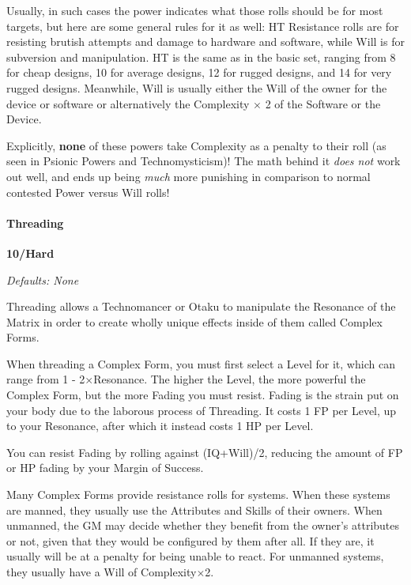 \begin{multicols*}{3}
	Usually, in such cases the power indicates what those rolls should be for most targets, but here are some general rules for it as well: HT Resistance rolls are for resisting brutish attempts and damage to hardware and software, while Will is for subversion and manipulation. HT is the same as in the basic set, ranging from 8 for cheap designs, 10 for average designs, 12 for rugged designs, and 14 for very rugged designs. Meanwhile, Will is usually either the Will of the owner for the device or software or alternatively the Complexity $\times$ 2 of the Software or the Device.
	
	Explicitly, \textbf{none} of these powers take Complexity as a penalty to their roll (as seen in Psionic Powers and Technomysticism)! The math behind it \textit{does not} work out well, and ends up being \textit{much} more punishing in comparison to normal contested Power versus Will rolls!
	
	\paragraph{Threading}\label{threading}
	\begin{flushright}
		\textbf{10/Hard}
	\end{flushright}
	\textcolor{NavyBlue}{\textit{Defaults: None}}
	
	Threading allows a Technomancer or Otaku to manipulate the Resonance of the Matrix in order to create wholly unique effects inside of them called Complex Forms.
	
	When threading a Complex Form, you must first select a Level for it, which can range from 1 - 2\(\times\)Resonance. The higher the Level, the more powerful the Complex Form, but the more Fading you must resist. Fading is the strain put on your body due to the laborous process of Threading. It costs 1 FP per Level, up to your Resonance, after which it instead costs 1 HP per Level.
	
	You can resist Fading by rolling against (IQ+Will)/2, reducing the amount of FP or HP fading by your Margin of Success.
	
	Many Complex Forms provide resistance rolls for systems. When these systems are manned, they usually use the Attributes and Skills of their owners. When unmanned, the GM may decide whether they benefit from the owner's attributes or not, given that they would be configured by them after all. If they are, it usually will be at a penalty for being unable to react. For unmanned systems, they usually have a Will of Complexity\(\times\)2.
	

\end{multicols*}
